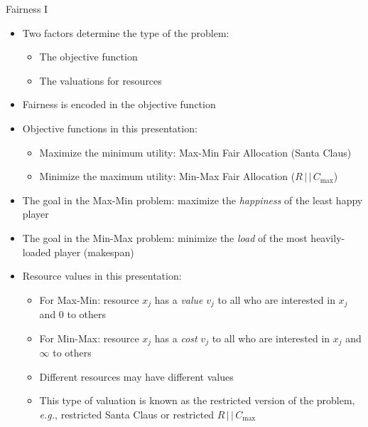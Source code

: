\documentclass[10pt]{beamer}
\begin{document}
\begin{frame}{Fairness I}
	\begin{itemize}
    	\item<1-> Two factors determine the type of the problem:
        	\begin{itemize}
            	\item<2-> The objective function
                \item<3-> The valuations for resources
            \end{itemize}
        \item<4-> Fairness is encoded in the objective function    
		\item<5-> Objective functions in this presentation:
        	\begin{itemize}
            	\item<6-> Maximize the minimum utility: \alert{Max-Min Fair Allocation} (\alert{Santa Claus})
                \item<7-> Minimize the maximum utility: \alert{Min-Max Fair Allocation} (\alert{$R \, | \, | \, C_{\max}$}) 
            \end{itemize}   
        \item<8-> The goal in the Max-Min problem: maximize the \emph{happiness} of the least happy player
        \item<9-> The goal in the Min-Max problem: minimize the \emph{load} of the most heavily-loaded player (makespan)
    \end{itemize}
\end{frame}
\begin{frame}
    \begin{itemize}
		\item<1-> Resource values in this presentation: 
        	\begin{itemize}
            	\item<2-> For Max-Min: resource $x_j$ has a \emph{value} $v_j$ to all who are interested in $x_j$ and $0$ to others
            	\item<3-> For Min-Max: resource $x_j$ has a \emph{cost} $v_j$ to all who are interested in $x_j$ and $\infty$ to others 
                \item<4-> Different resources may have different values
                \item<5-> This type of valuation is known as the \alert{restricted} version of the problem, \emph{e.g.}, \alert{restricted Santa Claus} or \alert{restricted $R \, | \, | \, C_{\max}$}
			\end{itemize}
    \end{itemize}
\end{frame}
\end{document}

